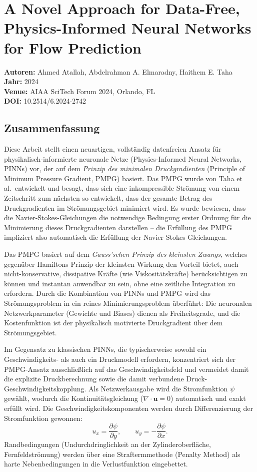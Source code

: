 \documentclass[a4paper,12pt]{article}
\begin{document}
\section*{A Novel Approach for Data-Free, Physics-Informed Neural Networks for Flow Prediction}
\textbf{Autoren:} Ahmed Atallah, Abdelrahman A. Elmaradny, Haithem E. Taha \\
\textbf{Jahr:} 2024 \\
\textbf{Venue:} AIAA SciTech Forum 2024, Orlando, FL \\
\textbf{DOI:} 10.2514/6.2024-2742

\subsection*{Zusammenfassung}

Diese Arbeit stellt einen neuartigen, vollständig datenfreien Ansatz für physikalisch-informierte neuronale Netze (Physics-Informed Neural Networks, PINNs) vor, der auf dem \textit{Prinzip des minimalen Druckgradienten} (Principle of Minimum Pressure Gradient, PMPG) basiert. Das PMPG wurde von Taha et al.\ entwickelt und besagt, dass sich eine inkompressible Strömung von einem Zeitschritt zum nächsten so entwickelt, dass der gesamte Betrag des Druckgradienten im Strömungsgebiet minimiert wird. Es wurde bewiesen, dass die Navier-Stokes-Gleichungen die notwendige Bedingung erster Ordnung für die Minimierung dieses Druckgradienten darstellen – die Erfüllung des PMPG impliziert also automatisch die Erfüllung der Navier-Stokes-Gleichungen.

Das PMPG basiert auf dem \textit{Gauss'schen Prinzip des kleinsten Zwangs}, welches gegenüber Hamiltons Prinzip der kleinsten Wirkung den Vorteil bietet, auch nicht-konservative, dissipative Kräfte (wie Viskositätskräfte) berücksichtigen zu können und instantan anwendbar zu sein, ohne eine zeitliche Integration zu erfordern. Durch die Kombination von PINNs und PMPG wird das Strömungsproblem in ein reines Minimierungsproblem überführt: Die neuronalen Netzwerkparameter (Gewichte und Biases) dienen als Freiheitsgrade, und die Kostenfunktion ist der physikalisch motivierte Druckgradient über dem Strömungsgebiet.

Im Gegensatz zu klassischen PINNs, die typischerweise sowohl ein Geschwindigkeits- als auch ein Druckmodell erfordern, konzentriert sich der PMPG-Ansatz ausschließlich auf das Geschwindigkeitsfeld und vermeidet damit die explizite Druckberechnung sowie die damit verbundene Druck-Geschwindigkeitskopplung. Als Netzwerkausgabe wird die Stromfunktion $\psi$ gewählt, wodurch die Kontinuitätsgleichung ($\nabla \cdot \mathbf{u} = 0$) automatisch und exakt erfüllt wird. Die Geschwindigkeitskomponenten werden durch Differenzierung der Stromfunktion gewonnen:
\begin{equation*}
    u_x = \frac{\partial \psi}{\partial y}, \qquad u_y = -\frac{\partial \psi}{\partial x}.
\end{equation*}
Randbedingungen (Undurchdringlichkeit an der Zylinderoberfläche, Fernfeldströmung) werden über eine Straftermmethode (Penalty Method) als harte Nebenbedingungen in die Verlustfunktion eingebettet.
\end{document}
